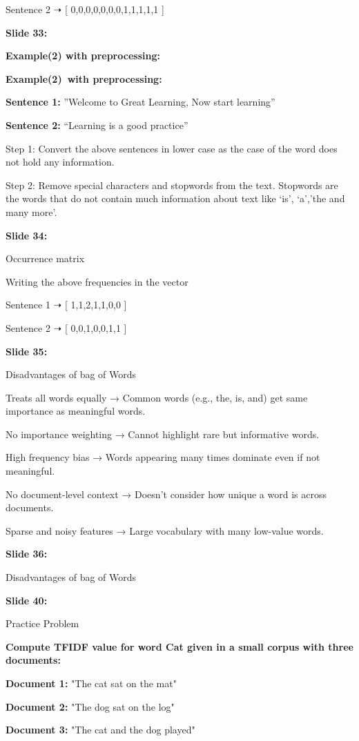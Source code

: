 \documentclass[11pt,a4paper]{article}
\begin{document}
Sentence 2 ➝ [ 0,0,0,0,0,0,0,1,1,1,1,1 ]

\textbf{Slide 33:}

\textbf{Example(2) with preprocessing:} 

\textbf{Example(2) with preprocessing:} 

\textbf{Sentence 1:}  ”Welcome to Great Learning, Now start learning”

\textbf{Sentence 2:}  “Learning is a good practice”

Step 1: Convert the above sentences in lower case as the case of the word does not hold any information.

Step 2: Remove special characters and stopwords from the text. Stopwords are the words that do not contain much information about text like ‘is’, ‘a’,’the and many more’.

\textbf{Slide 34:}

Occurrence matrix

Writing the above frequencies in the vector

Sentence 1 ➝ [ 1,1,2,1,1,0,0 ]

Sentence 2 ➝ [ 0,0,1,0,0,1,1 ]

\textbf{Slide 35:}

Disadvantages of bag of Words

Treats all words equally → Common words (e.g., the, is, and) get same importance as meaningful words.

No importance weighting → Cannot highlight rare but informative words.

High frequency bias → Words appearing many times dominate even if not meaningful.

No document-level context → Doesn’t consider how unique a word is across documents.

Sparse and noisy features → Large vocabulary with many low-value words.

\textbf{Slide 36:}

Disadvantages of bag of Words

\textbf{Slide 40:}

Practice Problem

\textbf{Compute TFIDF value for word Cat given in a small corpus with three documents:} 

\textbf{Document 1:}  "The cat sat on the mat"

\textbf{Document 2:}  "The dog sat on the log"

\textbf{Document 3:}  "The cat and the dog played"
\end{document}
